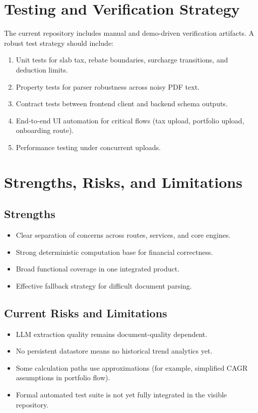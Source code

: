 \documentclass[12pt,a4paper]{article}
\begin{document}
\section{Testing and Verification Strategy}
The current repository includes manual and demo-driven verification artifacts. A robust test strategy should include:
\begin{enumerate}
	\item Unit tests for slab tax, rebate boundaries, surcharge transitions, and deduction limits.
	\item Property tests for parser robustness across noisy PDF text.
	\item Contract tests between frontend client and backend schema outputs.
	\item End-to-end UI automation for critical flows (tax upload, portfolio upload, onboarding route).
	\item Performance testing under concurrent uploads.
\end{enumerate}

\section{Strengths, Risks, and Limitations}
\subsection{Strengths}
\begin{itemize}
	\item Clear separation of concerns across routes, services, and core engines.
	\item Strong deterministic computation base for financial correctness.
	\item Broad functional coverage in one integrated product.
	\item Effective fallback strategy for difficult document parsing.
\end{itemize}

\subsection{Current Risks and Limitations}
\begin{itemize}
	\item LLM extraction quality remains document-quality dependent.
	\item No persistent datastore means no historical trend analytics yet.
	\item Some calculation paths use approximations (for example, simplified CAGR assumptions in portfolio flow).
	\item Formal automated test suite is not yet fully integrated in the visible repository.
\end{itemize}
\end{document}
